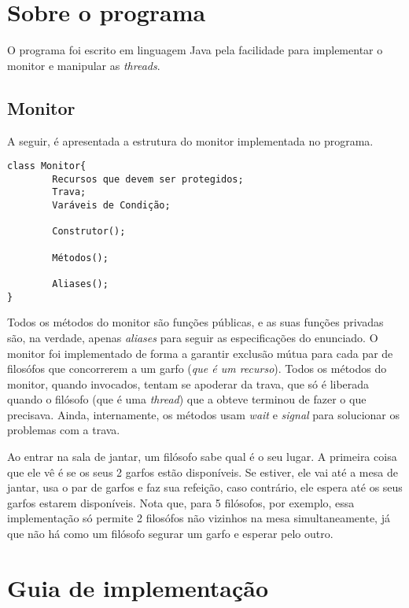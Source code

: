 \documentclass[11pt]{article}
\begin{document}
\section{Sobre o programa}

O programa foi escrito em linguagem Java pela facilidade para implementar o monitor e manipular as \textit{threads}.

\pagebreak

\subsection{Monitor}

A seguir, é apresentada a estrutura do monitor implementada no programa.

\begin{verbatim}
class Monitor{
	    Recursos que devem ser protegidos;
	    Trava;
	    Varáveis de Condição;

	    Construtor();

	    Métodos();

	    Aliases();
}
\end{verbatim}

Todos os métodos do monitor são funções públicas, e as suas funções privadas são, na verdade, apenas \textit{aliases} para seguir as especificações do enunciado. O monitor foi implementado de forma a garantir exclusão mútua para cada par de filosófos que concorrerem a um garfo (\textit{que é um recurso}). Todos os métodos do monitor, quando invocados, tentam se apoderar da trava, que só é liberada quando o filósofo (que é uma \textit{thread}) que a obteve terminou de fazer o que precisava. Ainda, internamente, os métodos usam \textit{wait} e \textit{signal} para solucionar os problemas com a trava.

Ao entrar na sala de jantar, um filósofo sabe qual é o seu lugar. A primeira coisa que ele vê é se os seus 2 garfos estão disponíveis. Se estiver, ele vai até a mesa de jantar, usa o par de garfos e faz sua refeição, caso contrário, ele espera até os seus garfos estarem disponíveis. Nota que, para 5 filósofos, por exemplo, essa implementação só permite 2 filosófos não vizinhos na mesa simultaneamente, já que não há como um filósofo segurar um garfo e esperar pelo outro.

\pagebreak
\section{Guia de implementação}
\end{document}
